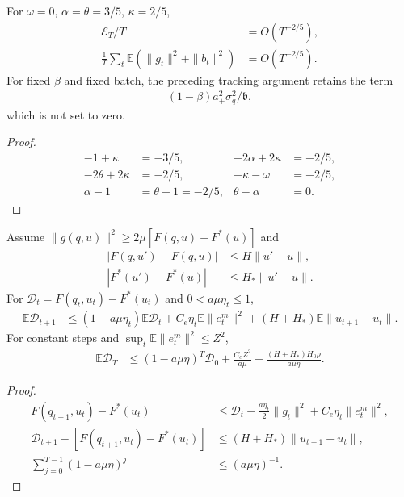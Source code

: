 \begin{corollary}
For $\omega=0$, $\alpha=\theta=3/5$, $\kappa=2/5$,
\begin{align}
 \mathscr E_T/T&=O(T^{-2/5}),\\
 \frac1T\sum_t\mathbb E(\|g_t\|^2+\|b_t\|^2)&=O(T^{-2/5}).
\end{align}
For fixed $\beta$ and fixed batch, the preceding tracking argument retains the term
\begin{align}
 (1-\beta)a_+^2\sigma_q^2/\mathfrak b,
\end{align}
which is not set to zero.
\end{corollary}
\begin{proof}
\begin{align}
 -1+\kappa&=-3/5,&-2\alpha+2\kappa&=-2/5,\\
 -2\theta+2\kappa&=-2/5,&-\kappa-\omega&=-2/5,\\
 \alpha-1&=\theta-1=-2/5,&\theta-\alpha&=0.
\end{align}
\end{proof}

\begin{proposition}
\label{prop:rigid-pl}
Assume $\|g(q,u)\|^2\ge2\mu[F(q,u)-F^*(u)]$ and
\begin{align}
 |F(q,u')-F(q,u)|&\le H\|u'-u\|,\\
 |F^*(u')-F^*(u)|&\le H_*\|u'-u\|.
\end{align}
For $\mathcal D_t=F(q_t,u_t)-F^*(u_t)$ and $0<a\mu\eta_t\le1$,
\begin{align}
 \mathbb E\mathcal D_{t+1}
 &\le(1-a\mu\eta_t)\mathbb E\mathcal D_t+
 C_e\eta_t\mathbb E\|e_{t}^{m}\|^2+(H+H_*)\mathbb E\|u_{t+1}-u_t\|.
\end{align}
For constant steps and $\sup_t\mathbb E\|e_{t}^{m}\|^2\le Z^2$,
\begin{align}
 \mathbb E\mathcal D_T
 &\le(1-a\mu\eta)^T\mathcal D_0+
 \frac{C_eZ^2}{a\mu}+
 \frac{(H+H_*)H_0\rho}{a\mu\eta}.
\end{align}
\end{proposition}
\begin{proof}
\begin{align}
 F(q_{t+1},u_t)-F^*(u_t)
 &\le\mathcal D_t-\tfrac{a\eta_t}{2}\|g_t\|^2+C_e\eta_t\|e_{t}^{m}\|^2,\\
 \mathcal D_{t+1}-[F(q_{t+1},u_t)-F^*(u_t)]
 &\le(H+H_*)\|u_{t+1}-u_t\|,\\
 \sum_{j=0}^{T-1}(1-a\mu\eta)^j&\le(a\mu\eta)^{-1}.
\end{align}
\end{proof}
